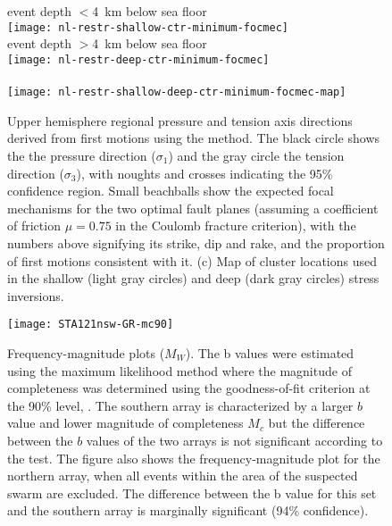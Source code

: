 \documentclass[reviewcopy]{elsarticle}
\renewcommand{\includegraphics}[2][]{\fbox{#2}}
\begin{document}
\begin{figure}
\begin{center}
{ event depth $<$4~km below sea floor}\\
\texttt{[image: nl-restr-shallow-ctr-minimum-focmec]}
\\
{ event depth $>$4~km below sea floor}\\
\texttt{[image: nl-restr-deep-ctr-minimum-focmec]}
\\
{ }\\
\texttt{[image: nl-restr-shallow-deep-ctr-minimum-focmec-map]}
\end{center}

\caption{Upper hemisphere regional pressure and tension axis
  directions derived from first motions using the \citet{robinson00}
  method. The black circle shows the the pressure direction
  ($\sigma_1$) and the gray circle the tension direction ($\sigma_3$), with noughts and
  crosses indicating the 95\% confidence region. Small beachballs show
 the expected focal mechanisms for the two optimal fault planes
 (assuming a coefficient of friction $\mu=0.75$ in the Coulomb
 fracture criterion), with the numbers above signifying its strike, dip and rake, and the proportion of first motions consistent with
it. (c) Map of cluster locations used in  the shallow (light gray
circles) and deep (dark gray circles) stress inversions.}
\label{fig:focmec}
\end{figure}



\begin{figure}
\centering
\texttt{[image: STA121nsw-GR-mc90]}
\caption{Frequency-magnitude plots ($M_W$). The b values were estimated using the maximum
likelihood method \citep{aki65} where the magnitude of completeness
was determined using the goodness-of-fit criterion at the 90\% level,
 \citep{wiemer02}.  The southern array is characterized by a larger
 $b$ value and lower magnitude of completeness $M_c$ but the
 difference between the $b$ values of the two arrays is not significant according to the
 \citet{utsu92} test. The figure also shows the frequency-magnitude
 plot for the northern array, when all events within the area of the
 suspected swarm are excluded.  The difference between the b value for
 this set and the southern array is marginally significant (94\%
 confidence).}


\label{fig:freq-mag}
\end{figure}
\end{document}
